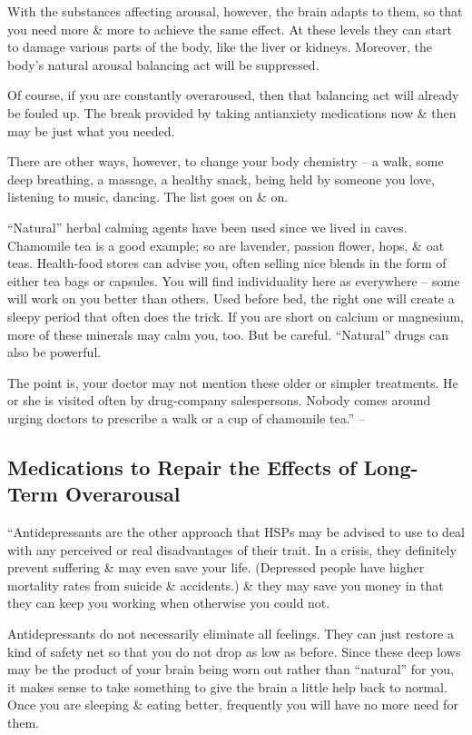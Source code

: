 \documentclass{article}
\numberwithin{equation}{section}
\begin{document}
With the substances affecting arousal, however, the brain adapts to them, so that you need more \& more to achieve the same effect. At these levels they can start to damage various parts of the body, like the liver or kidneys. Moreover, the body's natural arousal balancing act will be suppressed.

Of course, if you are constantly overaroused, then that balancing act will already be fouled up. The break provided by taking antianxiety medications now \& then may be just what you needed.

There are other ways, however, to change your body chemistry -- a walk, some deep breathing, a massage, a healthy snack, being held by someone you love, listening to music, dancing. The list goes on \& on.

``Natural'' herbal calming agents have been used since we lived in caves. Chamomile tea is a good example; so are lavender, passion flower, hops, \& oat teas. Health-food stores can advise you, often selling nice blends in the form of either tea bags or capsules. You will find individuality here as everywhere -- some will work on you better than others. Used before bed, the right one will create a sleepy period that often does the trick. If you are short on calcium or magnesium, more of these minerals may calm you, too. But be careful. ``Natural'' drugs can also be powerful.

The point is, your doctor may not mention these older or simpler treatments. He or she is visited often by drug-company salespersons. Nobody comes around urging doctors to prescribe a walk or a cup of chamomile tea.'' -- \cite[pp. 227--229]{Aron2013}

\subsection{Medications to Repair the Effects of Long-Term Overarousal}
``Antidepressants are the other approach that HSPs may be advised to use to deal with any perceived or real disadvantages of their trait. In a crisis, they definitely prevent suffering \& may even save your life. (Depressed people have higher mortality rates from suicide \& accidents.) \& they may save you money in that they can keep you working when otherwise you could not.

Antidepressants do not necessarily eliminate all feelings. They can just restore a kind of safety net so that you do not drop as low as before. Since these deep lows may be the product of your brain being worn out rather than ``natural'' for you, it makes sense to take something to give the brain a little help back to normal. Once you are sleeping \& eating better, frequently you will have no more need for them.
\end{document}
